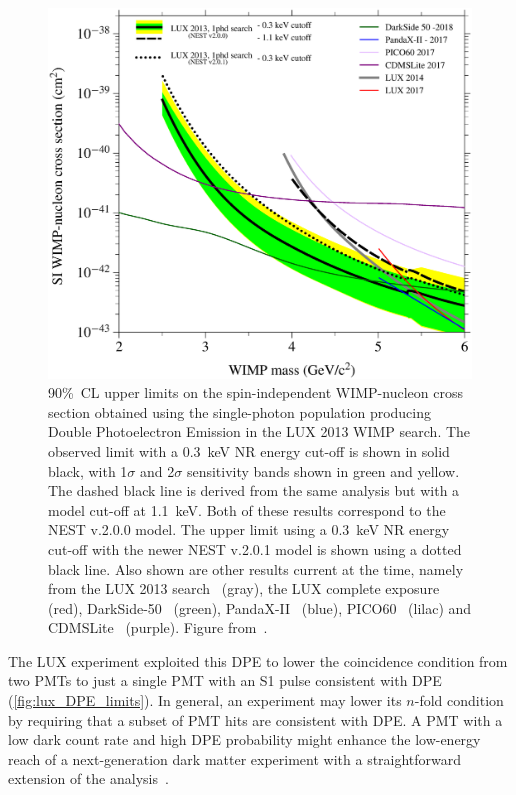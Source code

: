 \begin{figure}[!htbp]  
\begin{center}
\includegraphics[width=0.99\columnwidth]{fig_LUX_DPE_limits.eps}
\caption{90\%~CL upper limits on the spin-independent WIMP-nucleon cross section obtained using the single-photon population producing Double Photoelectron Emission in the LUX 2013 WIMP search. The observed limit with a 0.3~keV NR energy cut-off is shown in solid black, with 1$\sigma$ and 2$\sigma$ sensitivity bands shown in green and yellow. The dashed black line is derived from the same analysis but with a model cut-off at 1.1~keV. Both of these results correspond to the NEST v.2.0.0 model. The upper limit using a 0.3~keV NR energy cut-off with the newer NEST v.2.0.1 model is shown using a dotted black line. Also shown are other results current at the time, namely from the LUX 2013 search~\cite{Akerib:2015rjg} (gray), the LUX complete exposure~\cite{Akerib:2016vxi} (red), DarkSide-50~\cite{Agnes:2018ves} (green), PandaX-II~\cite{Cui:2017nnn} (blue), PICO60~\cite{Amole:2017dex} (lilac) and CDMSLite~\cite{Agnese:2015nto} (purple). Figure from~\cite{Akerib:2019zrt}.}
\label{fig:lux_DPE_limits}
\end{center} 
\end{figure}

The LUX experiment exploited this DPE to lower the coincidence condition from two PMTs to just a single PMT with an S1 pulse consistent with DPE~\cite{Akerib:2019zrt} (\autoref{fig:lux_DPE_limits}). In general, an experiment may lower its $n$-fold condition by requiring that a subset of PMT hits are consistent with DPE. A PMT with a low dark count rate and high DPE probability might enhance the low-energy reach of a next-generation dark matter experiment with a straightforward extension of the analysis~\cite{Akerib:2021pfd}.

